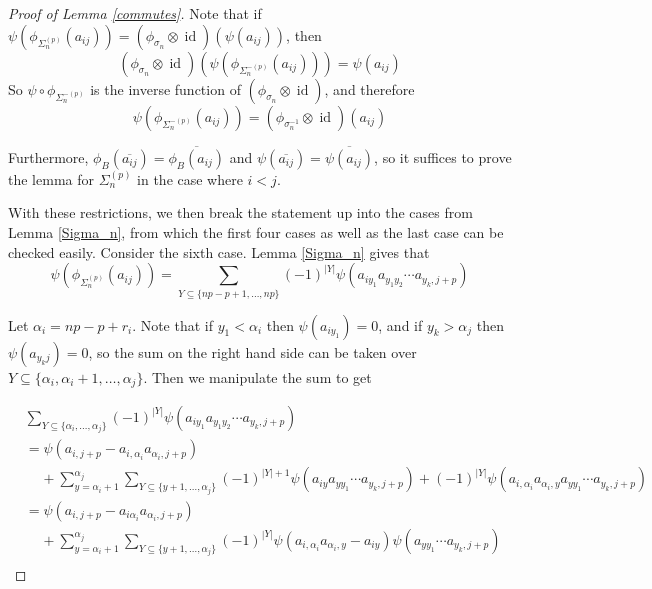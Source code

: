 \documentclass{amsart}[11pt,fullpage]
\def\s{{\sigma}}
\def\a{\alpha}
\newcommand\id{\operatorname{id}}
\newcommand\Sp{\Sigma^{(p)}}
\newcommand\SpM{\Sigma^{-(p)}}
\theoremstyle{definition}
\begin{document}
\begin{proof} [Proof of Lemma \ref{commutes}]
Note that if $\psi(\phi_{\Sp_n}(a_{ij})) = (\phi_{\s_n} \otimes \id)(\psi(a_{ij}))$, then
$$\left(\phi_{\s_n}\otimes\id\right)\left(\psi\left(\phi_{\SpM_n}\left(a_{ij}\right)\right)\right) = \psi(a_{ij})$$
So $\psi\circ\phi_{\SpM_n}$ is the inverse function of $\left(\phi_{\s_n}\otimes\id\right)$, and therefore
$$\psi\left(\phi_{\SpM_n}\left(a_{ij}\right)\right) = \left(\phi_{\s_n^{-1}}\otimes\id\right)(a_{ij})$$

Furthermore, $\phi_B(\overline{a_{ij}}) = \overline{\phi_B(a_{ij})}$ and $\psi(\overline{a_{ij}}) = \overline{\psi(a_{ij})}$, so it suffices to prove the lemma for $\Sp_n$ in the case where $i<j$.

With these restrictions, we then break the statement up into the cases from Lemma \ref{Sigma_n}, from which the first four cases as well as the last case can be checked easily. Consider the sixth case. Lemma \ref{Sigma_n} gives that
$$\psi\left(\phi_{\Sp_n}(a_{ij})\right) = \sum_{Y\subseteq \{np-p+1,\ldots,np\}}(-1)^{|Y|}\psi\left(a_{iy_1}a_{y_1y_2}\cdots a_{y_k,j+p}\right)$$


Let $\a_i  = np-p+r_i$. Note that if $y_1<\a_i$ then $\psi(a_{iy_1}) = 0$, and if $y_k>\a_j$ then $\psi(a_{y_kj}) = 0$, so the sum on the right hand side can be taken over $Y\subseteq\{\a_i,\a_i+1,\ldots,\a_j\}$. Then we manipulate the sum to get

\begin{align*}
& \sum_{Y\subseteq \{\a_i,\ldots,\a_j\}}(-1)^{|Y|}\psi\left(a_{iy_1}a_{y_1y_2}\cdots a_{y_k,j+p}\right)\\
&= \psi\left(a_{i,j+p} - a_{i,\a_i}a_{\a_i,j+p}\right)\\
& \;\;\;\;+ \sum_{y=\a_i+1}^{\a_j}\sum_{Y\subseteq \{y+1,\ldots,\a_j\}}(-1)^{|Y|+1}\psi\left(a_{iy}a_{yy_1}\cdots a_{y_k,j+p}\right) + (-1)^{|Y|}\psi\left(a_{i,\a_i}a_{\a_i,y}a_{yy_1}\cdots a_{y_k,j+p}\right)\\
&= \psi\left(a_{i,j+p} - a_{i\a_i}a_{\a_i,j+p}\right)\\
& \;\;\;\;+ \sum_{y=\a_i+1}^{\a_j}\sum_{Y\subseteq \{y+1,\ldots,\a_j\}}(-1)^{|Y|}\psi\left(a_{i,\a_i}a_{\a_i,y} - a_{iy}\right)\psi\left(a_{yy_1}\cdots a_{y_k,j+p}\right)\\
\end{align*}




\end{proof}
\end{document}
